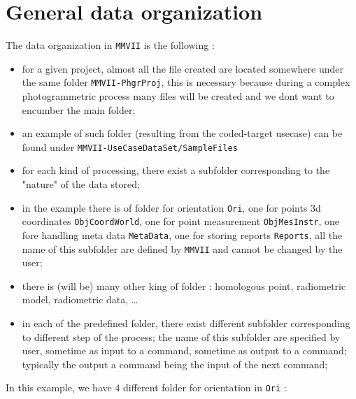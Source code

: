 
\section{General data organization}

The data organization in {\tt MMVII} is the following :

\begin{itemize}
     \item for a given project, almost all the file created are located somewhere under
           the same folder {\tt MMVII-PhgrProj},  this is necessary because during a complex 
           photogrammetric process many files will be created and we dont want to encumber
           the main folder;

     \item an example of such folder (resulting from the coded-target usecase) can be
	     found under {\tt MMVII-UseCaseDataSet/SampleFiles}

     \item for each kind of processing, there exist a subfolder corresponding to the "nature"
            of the data stored;

    \item  in the example there is of folder for orientation {\tt Ori}, one for points 3d coordinates
    {\tt ObjCoordWorld}, one for point measurement
	   {\tt ObjMesInstr}, one fore handling meta data {\tt MetaData}, one for storing reports
           {\tt Reports}, all the name of this subfolder are defined by {\tt MMVII} and cannot be changed
            by the user;

    \item there is (will be) many other king of folder : homologous point, radiometric model, radiometric data,
           \dots

     \item in each of the predefined folder, there exist different subfolder corresponding to different step
           of the process; the name of this subfolder are specified by user, sometime as input to a command,
	   sometime as output to a command; typically the output a command being the input of the next command;
\end{itemize}

In this example, we have $4$ different folder for orientation in {\tt Ori} :

